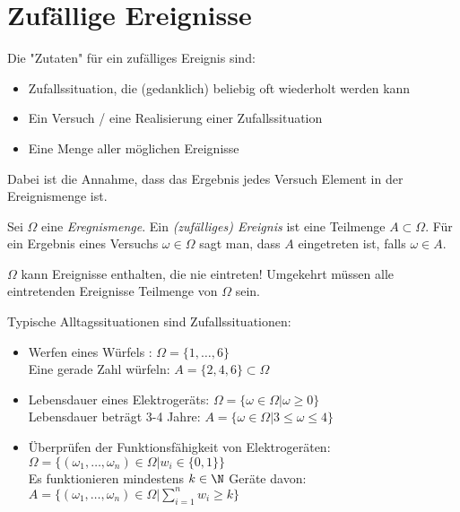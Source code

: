 \section{Zufällige Ereignisse}
Die "Zutaten" für ein zufälliges Ereignis sind:
\begin{itemize}
	\item Zufallssituation, die (gedanklich) beliebig oft wiederholt werden kann
	\item Ein Versuch / eine Realisierung einer Zufallssituation
	\item Eine Menge aller möglichen Ereignisse
\end{itemize}
Dabei ist die Annahme, dass das Ergebnis jedes Versuch Element in der Ereignismenge ist.
\begin{definition}
Sei $\Omega$ eine \emph{Eregnismenge}. Ein \emph{(zufälliges) Ereignis} ist eine Teilmenge $A \subset \Omega$. Für ein Ergebnis eines Versuchs $\omega \in \Omega$ sagt man, dass $A$ eingetreten ist, falls $\omega \in A$.   
\end{definition}
\begin{remark}
$\Omega$ kann Ereignisse enthalten, die nie eintreten! Umgekehrt müssen alle eintretenden Ereignisse Teilmenge von $\Omega$ sein.
\end{remark}
\begin{example}
Typische Alltagssituationen sind Zufallssituationen: 
\begin{itemize}
	\item Werfen eines Würfels : $\Omega = \{1,\ldots,6\}$ \\
		Eine gerade Zahl würfeln: $A = \{2,4,6\}\subset \Omega$
	\item Lebensdauer eines Elektrogeräts: $\Omega= \{\omega \in \Omega | \omega \ge 0\}$ \\ 
		Lebensdauer beträgt 3-4 Jahre: $A = \{\omega \in \Omega | 3\le \omega \le 4\}$ 
	\item Überprüfen der Funktionsfähigkeit von Elektrogeräten: $\Omega= \{(\omega_1,\ldots,\omega_n) \in \Omega | w_i \in \{0,1\} \}$ \\
		Es funktionieren mindestens $k \in \N$ Geräte davon: 
		$A = \{(\omega_1,\ldots,\omega_n) \in \Omega | \sum_{i=1}^{n}w_i\ge k\}$ 
\end{itemize}
\end{example}

